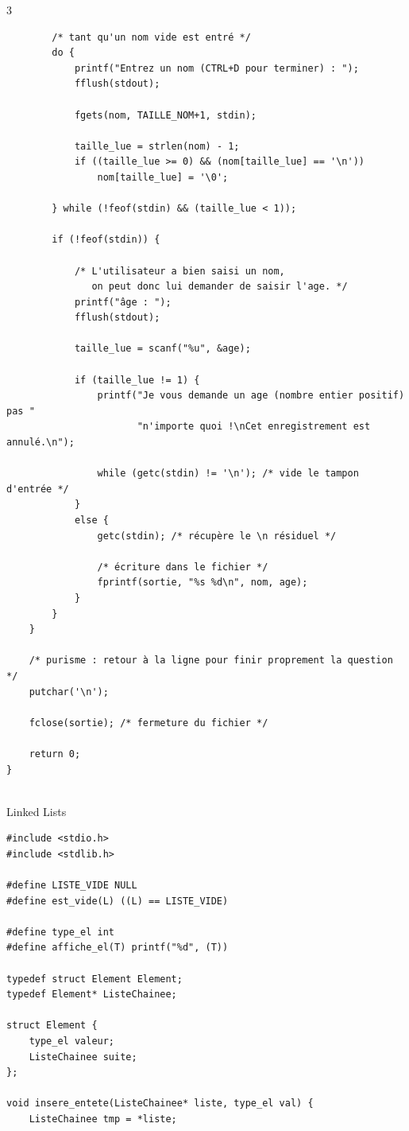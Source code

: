 \documentclass[8pt]{article}
\begin{document}
\begin{multicols*}{3}
\begin{lstlisting}
        /* tant qu'un nom vide est entré */
        do {
            printf("Entrez un nom (CTRL+D pour terminer) : ");
            fflush(stdout);

            fgets(nom, TAILLE_NOM+1, stdin);

            taille_lue = strlen(nom) - 1;
            if ((taille_lue >= 0) && (nom[taille_lue] == '\n'))
                nom[taille_lue] = '\0';

        } while (!feof(stdin) && (taille_lue < 1));

        if (!feof(stdin)) {

            /* L'utilisateur a bien saisi un nom,
               on peut donc lui demander de saisir l'age. */
            printf("âge : ");
            fflush(stdout);

            taille_lue = scanf("%u", &age);

            if (taille_lue != 1) {
                printf("Je vous demande un age (nombre entier positif) pas "
                       "n'importe quoi !\nCet enregistrement est annulé.\n");

                while (getc(stdin) != '\n'); /* vide le tampon d'entrée */
            }
            else {
                getc(stdin); /* récupère le \n résiduel */

                /* écriture dans le fichier */
                fprintf(sortie, "%s %d\n", nom, age);
            }
        }
    }

    /* purisme : retour à la ligne pour finir proprement la question */
    putchar('\n');

    fclose(sortie); /* fermeture du fichier */

    return 0;
}
  
\end{lstlisting} 

Linked Lists
\begin{lstlisting}
#include <stdio.h>
#include <stdlib.h>

#define LISTE_VIDE NULL
#define est_vide(L) ((L) == LISTE_VIDE)

#define type_el int
#define affiche_el(T) printf("%d", (T))

typedef struct Element Element;
typedef Element* ListeChainee;

struct Element {
    type_el valeur;
    ListeChainee suite;
};

void insere_entete(ListeChainee* liste, type_el val) {
    ListeChainee tmp = *liste;


\end{lstlisting}
\end{multicols*}
\end{document}
